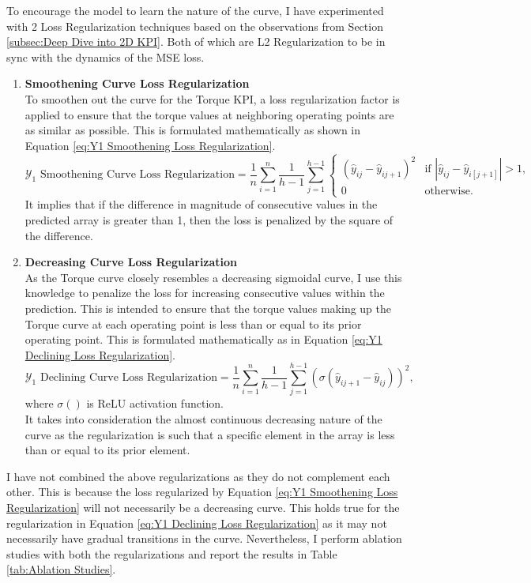 \documentclass{report} %
\begin{document}
To encourage the model to learn the nature of the curve, I have experimented with 2 Loss Regularization techniques based on the observations from Section 
\ref{subsec:Deep Dive into 2D KPI}. 
Both of which are L2 Regularization to be in sync with the dynamics of the \ac{MSE} loss.
\begin{enumerate}
\item \textbf{Smoothening Curve Loss Regularization} \\
To smoothen out the curve for the Torque \ac{KPI}, a loss regularization factor is applied to ensure that the torque values at neighboring operating points are 
as similar as possible. This is formulated mathematically as shown in Equation \ref{eq:Y1 Smoothening Loss Regularization}.
\begin{equation}
    \text{$\mathcal{Y}_1$ Smoothening Curve Loss Regularization} = \frac{1}{n} \sum_{i=1}^{n} \frac{1}{h-1} \sum_{j=1}^{h-1}
    \begin{cases} 
        \left( \hat{y}_{ij} - \hat{y}_{i{j+1}}  \right)^2 & \text{if } |\hat{y}_{ij} - \hat{y}_{i[j+1]}| > 1, \\
        0 & \text{otherwise}.
    \end{cases}
    \label{eq:Y1 Smoothening Loss Regularization}
\end{equation}
It implies that if the difference in magnitude of consecutive values in the predicted array is greater than 1, then the loss is penalized by the square of the difference.
\item \textbf{Decreasing Curve Loss Regularization} \\
As the Torque curve closely resembles a decreasing sigmoidal curve, I use this knowledge to penalize the loss for increasing consecutive values within the prediction. 
This is intended to ensure that the torque values making up the Torque curve at each operating point is less than or equal to its prior operating point.
This is formulated mathematically as in Equation \ref{eq:Y1 Declining Loss Regularization}.
\begin{equation}
    \text{$\mathcal{Y}_1$ Declining Curve Loss Regularization} = \frac{1}{n} \sum_{i=1}^{n}\frac{1}{h-1} \sum_{j=1}^{h-1} \left(\sigma(\hat{y}_{i{j+1}} - \hat{y}_{ij})\right)^2,
    \label{eq:Y1 Declining Loss Regularization}
\end{equation} 
where $\sigma()$ is \ac{ReLU} activation function.\\
It takes into consideration the almost continuous decreasing nature of the curve as the regularization is such that a specific element in the array is less than or 
equal to its prior element.

\end{enumerate}
I have not combined the above regularizations as they do not complement each other. This is because the loss regularized by Equation 
\ref{eq:Y1 Smoothening Loss Regularization} will not necessarily be a decreasing curve.
This holds true for the regularization in Equation \ref{eq:Y1 Declining Loss Regularization} as it may not necessarily have gradual transitions in the curve.
Nevertheless, I perform ablation studies with both the regularizations and report the results in Table \ref{tab:Ablation Studies}.
\end{document}
